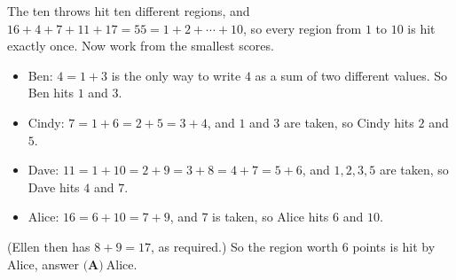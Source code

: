 The ten throws hit ten different regions, and $16+4+7+11+17=55=1+2+\cdots+10$, so every region from $1$ to $10$ is hit exactly once. Now work from the smallest scores.
\begin{itemize}
\item Ben: $4=1+3$ is the only way to write $4$ as a sum of two different values. So Ben hits $1$ and $3$.
\item Cindy: $7=1+6=2+5=3+4$, and $1$ and $3$ are taken, so Cindy hits $2$ and $5$.
\item Dave: $11=1+10=2+9=3+8=4+7=5+6$, and $1,2,3,5$ are taken, so Dave hits $4$ and $7$.
\item Alice: $16=6+10=7+9$, and $7$ is taken, so Alice hits $6$ and $10$.
\end{itemize}
(Ellen then has $8+9=17$, as required.) So the region worth $6$ points is hit by Alice, answer $\boxed{\textbf{(A)}\ \text{Alice}}$.
